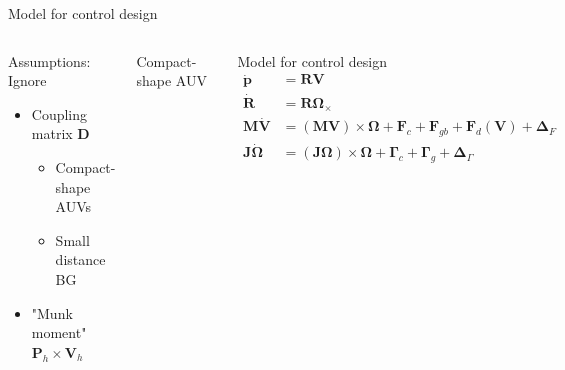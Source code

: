 \documentclass{beamer}
\begin{document}
\begin{frame}{Model for control design}
\begin{columns}
	\begin{block}{Assumptions: Ignore}
		\begin{itemize}
			\scriptsize
			\item Coupling matrix $\mathbf{D}$
			\begin{itemize}
				\scriptsize
				\item Compact-shape AUVs
				\item Small distance BG
			\end{itemize}
			\item "Munk moment" $\mathbf{P}_h \!\times \!\mathbf{V}_h$
		\end{itemize}		
	\end{block}
	\begin{block}{Compact-shape AUV}
		\begin{figure}
			\includegraphics[width = 1.0\textwidth]{Images/Bluerov.png}
		\end{figure}
	\end{block}
	\begin{block}{Model for control design}
		\scriptsize
		\[
		\begin{array}{rl}
		\dot{\mathbf{p}} & =  \mathbf{R} \mathbf{V} \label{eq:kinematicsPos}\\
		\dot{\mathbf{R}} & =  \mathbf{R} \mathbf{\Omega}_\times \\
		\mathbf{M}\dot{\mathbf{V}} &= (\mathbf{M}\mathbf{V}) \!\times\!\mathbf{\Omega} + \mathbf{F}_c + \mathbf{F}_{gb} + \mathbf{F}_d(\mathbf{V}) +\mathbf{\Delta}_F  \\
		\mathbf{J}\dot{\mathbf{\Omega}} &=  (\mathbf{J}\mathbf{\Omega}) \!\times\! \mathbf{\mathbf{\Omega}} + \mathbf{\Gamma}_c + \mathbf{\Gamma}_g +  \mathbf{\Delta}_{\Gamma}
		\end{array} 
		\]
		

\end{block}
\end{columns}
\end{frame}
\end{document}

